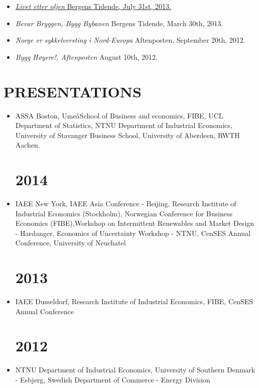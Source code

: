 \documentclass[margin]{res}
\begin{document}
\begin{resume}
\begin{itemize}
\item[] \href{http://www.nhh.no/Files/Filer/institutter/for/bedriftsøkonomisk_debatt/2013/mauritzen-livet_etter_oljen-bt-310713.pdf}{\emph {Livet etter oljen}  Bergens Tidende, July 31st, 2013.}
\item[] \emph {Bevar Bryggen, Bygg Bybanen}  Bergens Tidende, March 30th, 2013.
\item[] \emph {Norge er sykkelversting i Nord-Europa} Aftenposten, September 20th, 2012.
\item[] \emph {Bygg H\o yere!, Aftenposten} August 10th, 2012.
\end{itemize}

\section{PRESENTATIONS}      
 
\begin{itemize}
\normalsize{\section{2015}} 
\item[] ASSA Boston, Ume\aa School of Business and economics, FIBE, UCL Department of Statistics, NTNU Department of Industrial Economics, University of Stavanger Business School, University of Aberdeen, RWTH Aachen.
\normalsize{\section{2014}} 
\item[] IAEE New York, IAEE Asia Conference - Beijing, Research Institute of Industrial Economics (Stockholm), Norwegian Conference for Business Economics (FIBE),Workshop on Intermittent Renewables and Market Design - Hardanger, Economics of Uncertainty Workshop - NTNU, CenSES Annual Conference, University of Neuchatel  
\normalsize{\section{2013}}
\item[] IAEE Dusseldorf, Research Institute of Industrial Economics, FIBE, CenSES Annual Conference 
\normalsize{\section{2012}}
\item[] NTNU Department of Industrial Economics, University of Southern Denmark - Esbjerg, Swedish Department of Commerce - Energy Division
\end{itemize}


\end{resume}
\end{document}
